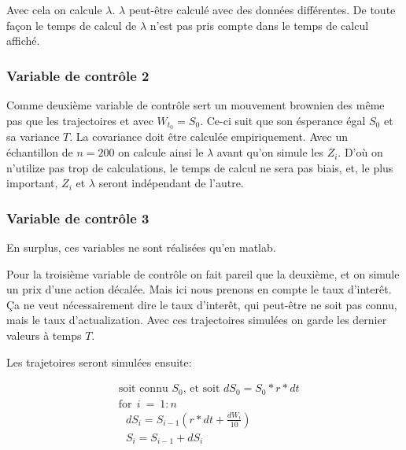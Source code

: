 \documentclass[a4paper,12pt]{scrartcl}
\begin{document}
Avec cela on calcule $\lambda$. $\lambda$ peut-être calculé avec des données différentes.
De toute façon le temps de calcul de $\lambda$ n'est pas pris compte dans le temps de calcul affiché.

\subsubsection{Variable de contrôle 2}

Comme deuxième variable de contrôle sert un mouvement brownien des même pas que les trajectoires et avec $W_{t_0}=S_0$.
Ce-ci suit que son ésperance égal $S_0$ et sa variance $T$.
La covariance doit être calculée empiriquement.
Avec un échantillon de $n=200$ on calcule ainsi le $\lambda$ avant qu'on simule les $Z_i$.
D'où on n'utilize pas trop de calculations, le temps de calcul ne sera pas biais,
et, le plus important, $Z_i$ et $\lambda$ seront indépendant de l'autre.



\subsubsection{Variable de contrôle 3}
En surplus, ces variables ne sont réalisées qu'en matlab.

Pour la troisième variable de contrôle on fait pareil que la deuxième, et on simule un prix d'une action décalée.
Mais ici nous prenons en compte le taux d'interêt. Ça ne veut nécessairement dire le taux d'interêt, qui peut-être ne soit pas connu, mais le taux d'actualization.
Avec ces trajectoires simulées on garde les dernier valeurs à temps $T$.

Les trajetoires seront simulées ensuite:

\begin{align*}
&\text{soit connu } S_0 \text{, et soit } dS_0 = S_0* r*dt  \\
&\text{for}~~ i~=~1:n \\
&~~~ dS_i = S_{i-1}(r*dt + \frac{dW_{i}}{10}) \\
&~~~ S_i  = S_{i-1} + dS_i
\end{align*}
\end{document}
